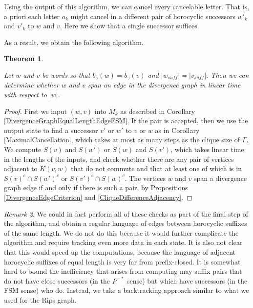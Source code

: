 \documentclass{amsart}
\newtheorem{theorem}{Theorem}[subsection]
\theoremstyle{definition}
\theoremstyle{remark}
\newtheorem{remark}[theorem]{Remark}
\begin{document}
	Using the output of this algorithm, we can cancel every cancelable letter. That is, a priori each letter $a_k$ might cancel in a different pair of horocyclic successors $w'_k$ and $v'_k$ to $w$ and $v$. Here we show that a single successor suffices.
	
	As a result, we obtain the following algorithm.
	
	\begin{theorem}\label{DivergenceEdgeSameLengthEdgeChecker}
		
		Let $w$ and $v$ be words so that $b_{\gamma}(w)=b_{\gamma}(v)$ and $|w_{suff}|=|v_{suff}|$. Then we can determine whether $w$ and $v$ span an edge in the divergence graph in linear time with respect to $|w|$.
		
	\end{theorem} 
	
	\begin{proof}
		
            First we input $(w,v)$ into $M_k$ as described in Corollary \ref{DivergenceGraphEqualLengthEdgeFSM}. If the pair is accepted, then we use the output state to find a successor $v'$ or $w'$ to $v$ or $w$ as in Corollary \ref{MaximalCancellation}, which takes at most as many steps as the clique size of $\Gamma$. We compute $S(v)$ and $S(w')$ or $S(w)$ and $S(v')$, which takes linear time in the lengths of the inputs, and check whether there are any pair of vertices adjacent to $K(v,w)$ that do not commute and that at least one of which is in $S(v)^c\cap S(w')^c$ or $S(v')^c\cap S(w)^c$. The vertices $w$ and $v$ span a divergence graph edge if and only if there is such a pair, by Propositions \ref{DivergenceEdgeCriterion} and \ref{CliqueDifferenceAdjacency}.
	\end{proof}
	
	\begin{remark}
		
		We could in fact perform all of these checks as part of the final step of the algorithm, and obtain a regular language of edges between horocyclic suffixes of the same length. We do not do this because it would further complicate the algorithm and require tracking even more data in each state. It is also not clear that this would speed up the computations, because the language of adjacent horocyclic suffixes of equal length is very far from prefix-closed. It is somewhat hard to bound the inefficiency that arises from computing may suffix pairs that do not have close successors (in the $P^{-*}$ sense) but which have successors (in the FSM sense) who do. Instead, we take a backtracking approach similar to what we used for the Rips graph.
	\end{remark}
	
\end{document}
